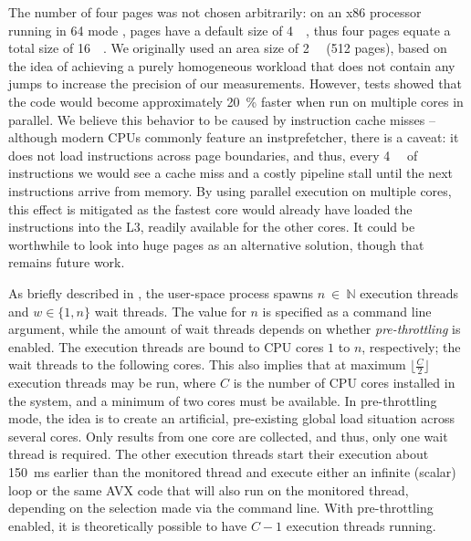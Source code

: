 The number of four pages was not chosen arbitrarily: on an x86 processor running in \SI{64}{\bit} mode \cite{intelsdmsysprogguide}, pages have a default size of \SI{4}{\kibi\byte}, thus four pages equate a total size of \SI{16}{\kibi\byte}. We originally used an area size of \SI{2}{\mebi\byte} (512 pages), based on the idea of achieving a purely homogeneous workload that does not contain any jumps to increase the precision of our measurements. However, tests showed that the code would become approximately \SI{20}{\percent} faster when run on multiple cores in parallel. We believe this behavior to be caused by instruction cache misses -- although modern \glspl{CPU} commonly feature an \gls{instprefetcher}, there is a caveat: it does not load instructions across page boundaries, and thus, every \SI{4}{\kibi\byte} of instructions we would see a cache miss and a costly pipeline stall until the next instructions arrive from memory. By using parallel execution on multiple cores, this effect is mitigated as the fastest core would already have loaded the instructions into the \gls{L3}, readily available for the other cores. It could be worthwhile to look into huge pages as an alternative solution, though that remains future work.

As briefly described in , the user-space process spawns $n~\in~\mathbb{N}$ execution threads and $w\in\{1,n\}$ wait threads. The value for $n$ is specified as a command line argument, while the amount of wait threads depends on whether \textit{pre-throttling} is enabled. The execution threads are bound to \gls{CPU} cores $1$ to $n$, respectively; the wait threads to the following cores. This also implies that at maximum $\lfloor{}\frac{C}{2}\rfloor{}$ execution threads may be run, where $C$ is the number of \gls{CPU} cores installed in the system, and a minimum of two cores must be available. In pre-throttling mode, the idea is to create an artificial, pre-existing global load situation across several cores. Only results from one core are collected, and thus, only one wait thread is required. The other execution threads start their execution about \SI{150}{\milli\second} earlier than the monitored thread and execute either an infinite (scalar) loop or the same \gls{AVX} code that will also run on the monitored thread, depending on the selection made via the command line. With pre-throttling enabled, it is theoretically possible to have $C-1$ execution threads running.

